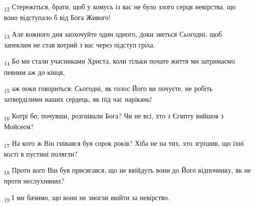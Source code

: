 \begin{tcolorbox}
\textsubscript{12} Стережіться, брати, щоб у комусь із вас не було злого серця невірства, що воно відступало б від Бога Живого!
\end{tcolorbox}
\begin{tcolorbox}
\textsubscript{13} Але кожного дня заохочуйте один одного, доки зветься Сьогодні, щоб запеклим не став котрий з вас через підступ гріха.
\end{tcolorbox}
\begin{tcolorbox}
\textsubscript{14} Бо ми стали учасниками Христа, коли тільки почате життя ми затримаємо певним аж до кінця,
\end{tcolorbox}
\begin{tcolorbox}
\textsubscript{15} аж поки говориться: Сьогодні, як голос Його ви почуєте, не робіть затверділими ваших сердець, як під час нарікань!
\end{tcolorbox}
\begin{tcolorbox}
\textsubscript{16} Котрі бо, почувши, розгнівали Бога? Чи не всі, хто з Єгипту вийшов з Мойсеєм?
\end{tcolorbox}
\begin{tcolorbox}
\textsubscript{17} На кого ж Він гнівався був сорок років? Хіба не на тих, хто згрішив, що їхні кості в пустині полягли?
\end{tcolorbox}
\begin{tcolorbox}
\textsubscript{18} Проти кого Він був присягався, що не ввійдуть вони до Його відпочинку, як не проти неслухняних?
\end{tcolorbox}
\begin{tcolorbox}
\textsubscript{19} І ми бачимо, що вони не змогли ввійти за невірство.
\end{tcolorbox}

